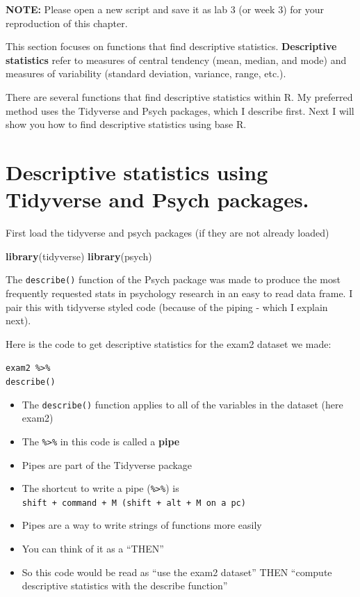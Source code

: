 \documentclass[
]{book}
\newenvironment{Shaded}{\begin{snugshade}}{\end{snugshade}}
\newcommand{\KeywordTok}[1]{\textcolor[rgb]{0.13,0.29,0.53}{\textbf{#1}}}
\newcommand{\NormalTok}[1]{#1}
\providecommand{\tightlist}{%
  \setlength{\itemsep}{0pt}\setlength{\parskip}{0pt}}
\begin{document}
\textbf{NOTE:} Please open a new script and save it as lab 3 (or week 3) for your reproduction of this chapter.

This section focuses on functions that find descriptive statistics. \textbf{Descriptive statistics} refer to measures of central tendency (mean, median, and mode) and measures of variability (standard deviation, variance, range, etc.).

There are several functions that find descriptive statistics within R. My preferred method uses the Tidyverse and Psych packages, which I describe first. Next I will show you how to find descriptive statistics using base R.

\hypertarget{descriptive-statistics-using-tidyverse-and-psych-packages.}{%
\section{Descriptive statistics using Tidyverse and Psych packages.}\label{descriptive-statistics-using-tidyverse-and-psych-packages.}}

First load the tidyverse and psych packages (if they are not already loaded)

\begin{Shaded}
\begin{Highlighting}[]
\KeywordTok{library}\NormalTok{(tidyverse)}
\KeywordTok{library}\NormalTok{(psych)}
\end{Highlighting}
\end{Shaded}

The \texttt{describe()} function of the Psych package was made to produce the most frequently requested stats in psychology research in an easy to read data frame. I pair this with tidyverse styled code (because of the piping - which I explain next).

Here is the code to get descriptive statistics for the exam2 dataset we made:

\texttt{exam2\ \%\textgreater{}\%}\\
\texttt{describe()}

\begin{itemize}
\tightlist
\item
  The \texttt{describe()} function applies to all of the variables in the dataset (here exam2)
\item
  The \texttt{\%\textgreater{}\%} in this code is called a \textbf{pipe}
\item
  Pipes are part of the Tidyverse package
\item
  The shortcut to write a pipe (\texttt{\%\textgreater{}\%}) is \texttt{shift\ +\ command\ +\ M\ (shift\ +\ alt\ +\ M\ on\ a\ pc)}
\item
  Pipes are a way to write strings of functions more easily
\item
  You can think of it as a ``THEN''
\item
  So this code would be read as ``use the exam2 dataset'' THEN ``compute descriptive statistics with the describe function''
\end{itemize}
\end{document}

